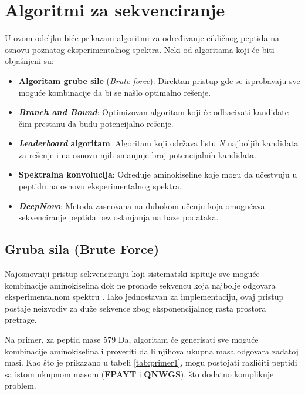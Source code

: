 \documentclass[12pt,oneside]{memoir}
\begin{document}
\chapter{Algoritmi za sekvenciranje}
U ovom odeljku biće prikazani algoritmi za određivanje cikličnog peptida na osnovu poznatog eksperimentalnog spektra. Neki od algoritama koji će biti objašnjeni su:
\begin{itemize}
    \item \textbf{Algoritam grube sile} (\emph{Brute force}): Direktan pristup gde se isprobavaju sve moguće kombinacije da bi se našlo optimalno rešenje.
    \item \textbf{\emph{Branch and Bound}}: Optimizovan algoritam koji će odbacivati kandidate čim prestanu da budu potencijalno rešenje.
    \item \textbf{\emph{Leaderboard} algoritam}: Algoritam koji održava listu \emph{N} najboljih kandidata za rešenje i na osnovu njih smanjuje broj potencijalnih kandidata.
    \item \textbf{Spektralna konvolucija}: Određuje aminokiseline koje mogu da učestvuju u peptidu na osnovu eksperimentalnog spektra.
    \item \textbf{\emph{DeepNovo}}: Metoda zasnovana na dubokom učenju koja omogućava sekvenciranje peptida bez oslanjanja na baze podataka.
\end{itemize}

\section{Gruba sila (Brute Force)}
Najosnovniji pristup sekvenciranju koji sistematski ispituje sve moguće kombinacije aminokiselina dok ne pronađe sekvencu koja najbolje odgovara eksperimentalnom spektru \cite{online_lecture, online_book}. Iako jednostavan za implementaciju, ovaj pristup postaje neizvodiv za duže sekvence zbog eksponencijalnog rasta prostora pretrage.

Na primer, za peptid mase 579 Da, algoritam će generisati sve moguće kombinacije aminokiselina i proveriti da li njihova ukupna masa odgovara zadatoj masi. Kao što je prikazano u tabeli \ref{tab:primer1}, mogu postojati različiti peptidi sa istom ukupnom masom (\textbf{FPAYT} i \textbf{QNWGS}), što dodatno komplikuje problem.
\end{document}
